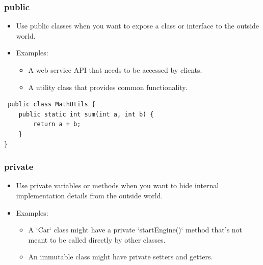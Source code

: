 \documentclass{book}
\begin{document}
\subsubsection{public}
\begin{itemize}
	\item Use public classes when you want to expose a class or interface to the outside world.
	\item Examples:
	      \begin{itemize}
		      \item  A web service API that needs to be accessed by clients.
		      \item  A utility class that provides common functionality.
	      \end{itemize}
\end{itemize}
\begin{verbatim}
 public class MathUtils {
    public static int sum(int a, int b) {
        return a + b;
    }
}  
\end{verbatim}
\subsubsection{private}
\begin{itemize}
	\item Use private variables or methods when you want to hide internal implementation details from the outside world.
	\item Examples:
	      \begin{itemize}
		      \item A `Car` class might have a private `startEngine()` method that's not meant to be called directly by other classes.
		      \item An immutable class might have private setters and getters.
	      \end{itemize}
\end{itemize}
\end{document}
